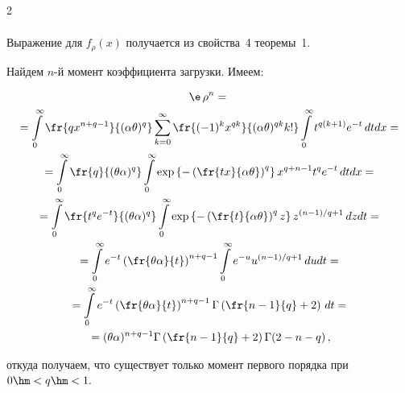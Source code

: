 \begin{multicols}{2}
\begin{multline*}
\end{multline*}


Выражение для $f_\rho(x)$ получается из свойства~4 теоремы~1.


Найдем $n$-й момент коэффициента загрузки. Имеем:


\begin{multline*}


\e\,\rho^n ={}\\


{}=


\int\limits_0^\infty 


\fr{qx^{n+q-1}}{{(\alpha\theta )^q}}\sum\limits_{k=0}^\infty


\fr{(-1)^kx^{qk}}{{(\alpha \theta)^{qk}k!}}  


 \int\limits_0^\infty t^{q(k+1)}e^{-t}\, dt dx={}\\


{}= \int\limits_0^\infty \fr{q}{{(\theta \alpha)^q}}


\int\limits_0^\infty \exp\left\lbrace -\left(


\fr{tx}{{\alpha \theta}}\right)^q\right\rbrace x^{q+n-1} t^q e^{-t}\, dt   dx={}\\


 {}= \int\limits_0^\infty \fr{t^q e^{-t}}{{(\theta \alpha)^q}}


\int\limits_0^\infty \exp\left\lbrace -\left(


\fr{t}{{\alpha \theta}}\right)^qz\right\rbrace z^{(n-1)/q + 1} \, dz  dt={}\\


{}= \int\limits_0^\infty e^{-t}\left(


\fr{\theta \alpha}{t}\right)^{n+q-1}\int\limits_0^\infty e^{-u}


 u^{(n-1)/q + 1} \, du dt ={}\\


{}= \int\limits_0^\infty e^{-t}\left(


\fr{\theta \alpha}{{t}}\right)^{n+q-1}\Gamma\left(\fr{n-1}{q} + 2\right) \, dt={}\\


{}=(\theta \alpha)^{n+q-1}\Gamma\left(\fr{n-1}{q} + 2\right) \Gamma (2-n-q)\,, 


\end{multline*}


откуда получаем, что существует только момент первого порядка при $0\hm<q\hm<1.$






\end{multicols}

